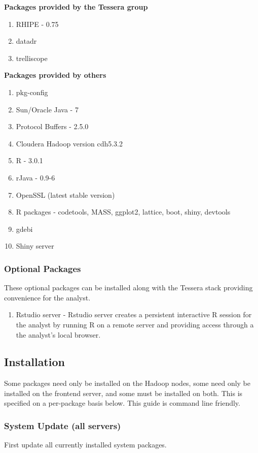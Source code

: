 \textbf{Packages provided by the Tessera group}
\begin{enumerate}
\item RHIPE - 0.75
\item datadr
\item trelliscope
\end{enumerate}
\textbf{Packages provided by others}
\begin{enumerate}
\item pkg-config
\item Sun/Oracle Java - 7
\item Protocol Buffers - 2.5.0 
\item Cloudera Hadoop version cdh5.3.2
\item R - 3.0.1
\item rJava - 0.9-6 
\item OpenSSL (latest stable version)
\item R packages - codetools, MASS, ggplot2, lattice, boot, shiny, devtools
\item gdebi
\item Shiny server
\end{enumerate}

\subsubsection{Optional Packages}
These optional packages can be installed along with the Tessera stack providing convenience for the analyst. 
\begin{enumerate}
\item Rstudio server - Rstudio server creates a persistent interactive R session for the analyst by running R on a remote server and providing access through a the analyst's local browser.
\end{enumerate}

\newpage

\subsection{Installation}
Some packages need only be installed on the Hadoop nodes, some need only
be installed on the frontend server, and some must be installed on both.
This is specified on a per-package basis below. This guide is command
line friendly.


\subsubsection{System Update (all servers)}
First update all currently installed system packages.

